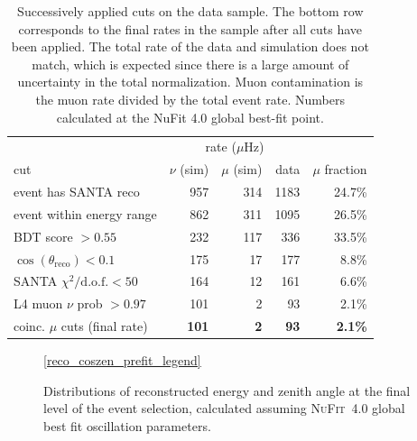 \begin{table}
\caption{Successively applied cuts on the data sample. The bottom row corresponds to the final rates in the sample after all cuts have been applied. The total rate of the data and simulation does not match, which is expected since there is a large amount of uncertainty in the total normalization. Muon contamination is the muon rate divided by the total event rate. Numbers calculated at the NuFit 4.0 global best-fit point.}
\centering
\begin{tabular}{@{}lrrrr@{}}\toprule
& \multicolumn{3}{c}{rate ($\mu$Hz)} & \\ \cmidrule{2-4}
cut                                 & $\nu$ (sim) & $\mu$ (sim) & data & $\mu$ fraction \\ \midrule
event has SANTA reco                   & 957  & 314  & 1183 & 24.7\%  \\
event within energy range              & 862  & 311  & 1095 & 26.5\%  \\
BDT score $>0.55$                      & 232  & 117  &  336 & 33.5\%  \\
$\cos(\theta_{\mathrm{reco}}) < 0.1$   & 175  &  17  &  177 & 8.8\%   \\
SANTA $\chi^2/\mathrm{d.o.f.} < 50$    & 164  &  12  &  161 & 6.6\%   \\
L4 muon $\nu$ prob $> 0.97$            & 101  &   2  &   93 & 2.1\% \\
\midrule\addlinespace
coinc. $\mu$ cuts (final rate) & \textbf{101} & \textbf{2} & \textbf{93} & \textbf{2.1\%
} \\ \bottomrule
\end{tabular}
\label{tab:muon-rejection-cut-rates}
\end{table}

\begin{figure}
    \centering
    \ref{reco_coszen_prefit_legend}\par
    
    
    \caption{Distributions of reconstructed energy and zenith angle at the final level of the event selection, calculated assuming \textsc{NuFit}~4.0\cite{nufit40} global best fit oscillation parameters.}
    \label{fig:pre-fit-energy-coszen}
\end{figure}